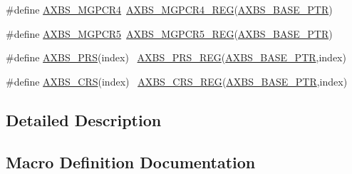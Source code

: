 \begin{DoxyCompactItemize}
\item 
\#define \hyperlink{group___a_x_b_s___register___accessor___macros_gae3f8cd76e1859270c547ecbd1c30f079}{A\+X\+B\+S\+\_\+\+M\+G\+P\+C\+R4}~\hyperlink{group___a_x_b_s___register___accessor___macros_ga90e0d4d501d3b780839f0b6b2abb7f74}{A\+X\+B\+S\+\_\+\+M\+G\+P\+C\+R4\+\_\+\+R\+EG}(\hyperlink{group___a_x_b_s___peripheral_gacbbf56489b86d1ddb3e0ac291922a56d}{A\+X\+B\+S\+\_\+\+B\+A\+S\+E\+\_\+\+P\+TR})
\item 
\#define \hyperlink{group___a_x_b_s___register___accessor___macros_gac7bb0cca5fc0f31eb9842e7fd07cb1e4}{A\+X\+B\+S\+\_\+\+M\+G\+P\+C\+R5}~\hyperlink{group___a_x_b_s___register___accessor___macros_ga4cd80d50972f855787c94c536aa9bf83}{A\+X\+B\+S\+\_\+\+M\+G\+P\+C\+R5\+\_\+\+R\+EG}(\hyperlink{group___a_x_b_s___peripheral_gacbbf56489b86d1ddb3e0ac291922a56d}{A\+X\+B\+S\+\_\+\+B\+A\+S\+E\+\_\+\+P\+TR})
\item 
\#define \hyperlink{group___a_x_b_s___register___accessor___macros_ga62bcd3b1a0e6baa9daf5bfb57430422b}{A\+X\+B\+S\+\_\+\+P\+RS}(index)                                                ~\hyperlink{group___a_x_b_s___register___accessor___macros_gadfe35678a94e899b6b19386de08d3472}{A\+X\+B\+S\+\_\+\+P\+R\+S\+\_\+\+R\+EG}(\hyperlink{group___a_x_b_s___peripheral_gacbbf56489b86d1ddb3e0ac291922a56d}{A\+X\+B\+S\+\_\+\+B\+A\+S\+E\+\_\+\+P\+TR},index)
\item 
\#define \hyperlink{group___a_x_b_s___register___accessor___macros_ga4a8510c9fc2b213af3b61317c78f3252}{A\+X\+B\+S\+\_\+\+C\+RS}(index)                                                ~\hyperlink{group___a_x_b_s___register___accessor___macros_ga77c6588049d7ae23bbfd8c643a5adbed}{A\+X\+B\+S\+\_\+\+C\+R\+S\+\_\+\+R\+EG}(\hyperlink{group___a_x_b_s___peripheral_gacbbf56489b86d1ddb3e0ac291922a56d}{A\+X\+B\+S\+\_\+\+B\+A\+S\+E\+\_\+\+P\+TR},index)
\end{DoxyCompactItemize}


\subsection{Detailed Description}


\subsection{Macro Definition Documentation}
